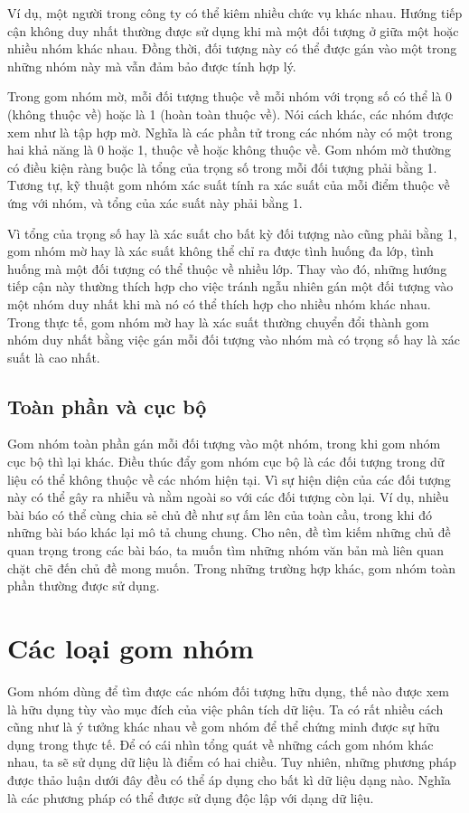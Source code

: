 Ví dụ, một người trong công ty có thể kiêm nhiều chức vụ khác nhau.
Hướng tiếp cận không duy nhất thường được sử dụng khi mà một đối tượng ở giữa một hoặc nhiều nhóm khác nhau.
Đồng thời, đối tượng này có thể được gán vào một trong những nhóm này mà vẫn đảm bảo được tính hợp lý.

Trong gom nhóm mờ, mỗi đối tượng thuộc về mỗi nhóm với trọng số có thể là 0 (không thuộc về) hoặc là 1 (hoàn toàn thuộc về).
Nói cách khác, các nhóm được xem như là tập hợp mờ.
Nghĩa là các phần tử trong các nhóm này có một trong hai khả năng là 0 hoặc 1, thuộc về hoặc không thuộc về.
Gom nhóm mờ thường có điều kiện ràng buộc là tổng của trọng số trong mỗi đối tượng phải bằng 1.
Tương tự, kỹ thuật gom nhóm xác suất tính ra xác suất của mỗi điểm thuộc về ứng với nhóm, và tổng của xác suất này phải bằng 1.

Vì tổng của trọng số hay là xác suất cho bất kỳ đối tượng nào cũng phải bằng 1, gom nhóm mờ hay là xác suất không thể chỉ ra được tình huống đa lớp, tình huống mà một đối tượng có thể thuộc về nhiều lớp.
Thay vào đó, những hướng tiếp cận này thường thích hợp cho việc tránh ngẫu nhiên gán một đối tượng vào một nhóm duy nhất khi mà nó có thể thích hợp cho nhiều nhóm khác nhau.
Trong thực tế, gom nhóm mờ hay là xác suất thường chuyển đổi thành gom nhóm duy nhất bằng việc gán mỗi đối tượng vào nhóm mà có trọng số hay là xác suất là cao nhất.

\subsection{Toàn phần và cục bộ}
Gom nhóm toàn phần gán mỗi đối tượng vào một nhóm, trong khi gom nhóm cục bộ thì lại khác.
Điều thúc đẩy gom nhóm cục bộ là các đối tượng trong dữ liệu có thể không thuộc về các nhóm hiện tại.
Vì sự hiện diện của các đối tượng này có thể gây ra nhiễu và nằm ngoài so với các đối tượng còn lại.
Ví dụ, nhiều bài báo có thể cùng chia sẻ chủ đề như sự ấm lên của toàn cầu, trong khi đó những bài báo khác lại mô tả chung chung.
Cho nên, đề tìm kiếm những chủ đề quan trọng trong các bài báo, ta muốn tìm những nhóm văn bản mà liên quan chặt chẽ đến chủ đề mong muốn.
Trong những trường hợp khác, gom nhóm toàn phần thường được sử dụng. 

\section{Các loại gom nhóm}
\label{sec:clgn}
Gom nhóm dùng để tìm được các nhóm đối tượng hữu dụng, thế nào được xem là hữu dụng tùy vào mục đích của việc phân tích dữ liệu.
Ta có rất nhiều cách cũng như là ý tưởng khác nhau về gom nhóm để thể chứng minh được sự hữu dụng trong thực tế.
Để có cái nhìn tổng quát về những cách gom nhóm khác nhau, ta sẽ sử dụng dữ liệu là điểm có hai chiều.
Tuy nhiên, những phương pháp được thảo luận dưới đây đều có thể áp dụng cho bất kì dữ liệu dạng nào.
Nghĩa là các phương pháp có thể được sử dụng độc lập với dạng dữ liệu.

